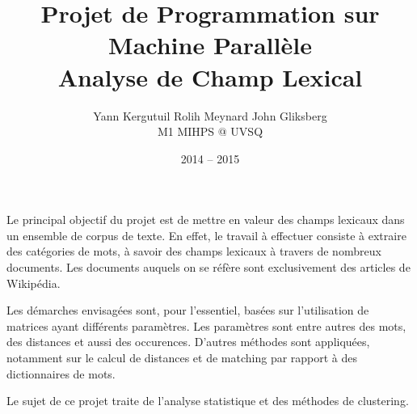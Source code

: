 \documentclass[a4paper,11pt]{article}
\title{ Projet de Programmation sur Machine Parallèle \\
       \bf Analyse de Champ Lexical}
\author{ Yann  Kergutuil \quad
         Rolih Meynard   \quad
         John  Gliksberg \quad \\
         M1 MIHPS @ UVSQ}
\date{2014 \--- 2015}
\theoremstyle{definition}
\begin{document}
\maketitle
\pagebreak
\tableofcontents

\pagebreak

Le principal objectif du projet est de mettre en valeur
des champs lexicaux dans un ensemble de corpus de texte.
En effet, le travail à effectuer consiste à extraire des
catégories de mots, à savoir des champs lexicaux à travers
de nombreux documents.
Les documents auquels on se réfère sont exclusivement des
articles de Wikipédia.

Les démarches envisagées sont, pour l'essentiel, basées sur
l'utilisation de matrices ayant différents paramètres.
Les paramètres sont entre autres des mots, des distances et
aussi des occurences. D'autres méthodes sont appliquées,
notamment sur le calcul de distances et de matching par rapport
à des dictionnaires de mots.

Le sujet de ce projet traite de l'analyse statistique
et des méthodes de clustering.



\pagebreak


\pagebreak


\pagebreak


\pagebreak


\pagebreak

\end{document}
